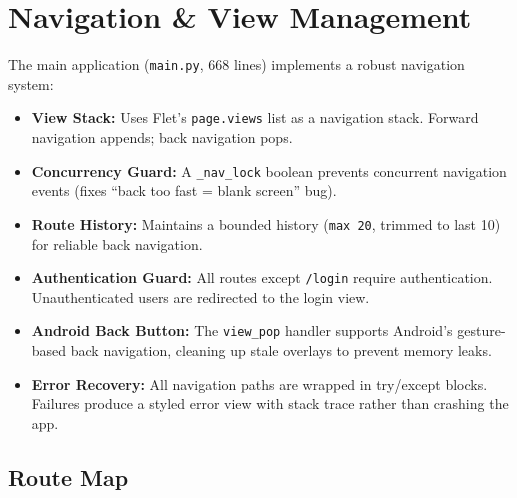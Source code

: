 \documentclass[12pt,a4paper]{article}
\begin{document}
\section{Navigation \& View Management}

The main application (\texttt{main.py}, 668 lines) implements a robust navigation system:

\begin{itemize}[leftmargin=2em]
    \item \textbf{View Stack:} Uses Flet's \texttt{page.views} list as a navigation stack. Forward navigation appends; back navigation pops.
    \item \textbf{Concurrency Guard:} A \texttt{\_nav\_lock} boolean prevents concurrent navigation events (fixes ``back too fast = blank screen'' bug).
    \item \textbf{Route History:} Maintains a bounded history (\texttt{max 20}, trimmed to last 10) for reliable back navigation.
    \item \textbf{Authentication Guard:} All routes except \texttt{/login} require authentication. Unauthenticated users are redirected to the login view.
    \item \textbf{Android Back Button:} The \texttt{view\_pop} handler supports Android's gesture-based back navigation, cleaning up stale overlays to prevent memory leaks.
    \item \textbf{Error Recovery:} All navigation paths are wrapped in try/except blocks. Failures produce a styled error view with stack trace rather than crashing the app.
\end{itemize}

\subsection{Route Map}
\end{document}
